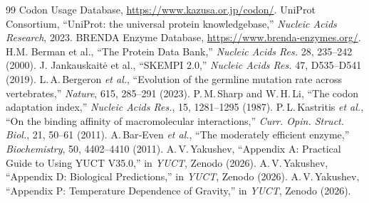 \documentclass[12pt,a4paper]{article}
\begin{document}
	\begin{thebibliography}{99}
		 Codon Usage Database, \url{https://www.kazusa.or.jp/codon/}.
		 UniProt Consortium, ``UniProt: the universal protein knowledgebase,'' \emph{Nucleic Acids Research}, 2023.
		 BRENDA Enzyme Database, \url{https://www.brenda-enzymes.org/}.
		 H.M. Berman et al., ``The Protein Data Bank,'' \emph{Nucleic Acids Res.} 28, 235–242 (2000).
		 J. Jankauskaitė et al., ``SKEMPI 2.0,'' \emph{Nucleic Acids Res.} 47, D535–D541 (2019).
		 L.\,A.\,Bergeron \emph{et al.}, ``Evolution of the germline mutation rate across vertebrates,'' \emph{Nature}, 615, 285–291 (2023).
		 P.\,M.\,Sharp and W.\,H.\,Li, ``The codon adaptation index,'' \emph{Nucleic Acids Res.}, 15, 1281–1295 (1987).
		 P.\,L.\,Kastritis \emph{et al.}, ``On the binding affinity of macromolecular interactions,'' \emph{Curr. Opin. Struct. Biol.}, 21, 50–61 (2011).
		 A.\,Bar‑Even \emph{et al.}, ``The moderately efficient enzyme,'' \emph{Biochemistry}, 50, 4402–4410 (2011).
		 A.\,V.\,Yakushev, ``Appendix A: Practical Guide to Using YUCT V35.0,'' in \emph{YUCT}, Zenodo (2026).
		 A.\,V.\,Yakushev, ``Appendix D: Biological Predictions,'' in \emph{YUCT}, Zenodo (2026).
		 A.\,V.\,Yakushev, ``Appendix P: Temperature Dependence of Gravity,'' in \emph{YUCT}, Zenodo (2026).
	\end{thebibliography}
	
\end{document}
